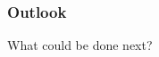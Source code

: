 \documentclass[main]{subfiles}
\begin{document}
\begin{frame}
\frametitle{Outlook}
What could be done next?
\end{frame}

\begin{comment}
\begin{frame}

  \frametitle{Contents}
  \tableofcontents[currentsection]
\end{frame}


\section{Something}

\frame{

  \frametitle{Evolving Virtual Creatures}
  
  \begin{columns}
   \column{0.3\textwidth}
 \begin{itemize}
	     \item a
    	\item b
    	\item c
     \end{itemize}
     
     \column{0.6\textwidth}
  \end{columns}
  }
\note{}

\begin{frame}
\textbf{New colors and their names\\}
Here we show the different colors you can use. From left to right, this are the colors ETH1, ETH2, \ldots , ETH9.


\end{comment}
\end{document}
